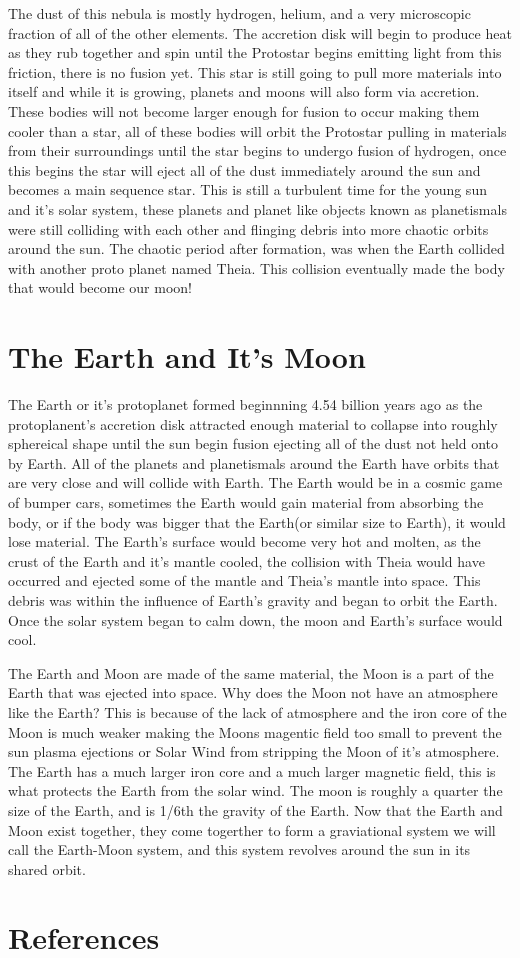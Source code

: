 \documentclass[12pt,oneside,a4paper,english]{article}
\begin{document}
The dust of this nebula is mostly hydrogen, helium, and a very microscopic fraction of all of the other elements. The accretion disk will begin to produce heat as they rub together and spin until the Protostar begins emitting light from this friction, there is no fusion yet. This star is still going to pull more materials into itself and while it is growing, planets and moons will also form via accretion. These bodies will not become larger enough for fusion to occur making them cooler than a star, all of these bodies will orbit the Protostar pulling in materials from their surroundings until the star begins to undergo fusion of hydrogen, once this begins the star will eject all of the dust immediately around the sun and becomes a main sequence star. This is still a turbulent time for the young sun and it's solar system, these planets and planet like objects known as planetismals were still colliding with each other and flinging debris into more chaotic orbits around the sun. The chaotic period after formation, was when the Earth collided with another proto planet named Theia\cite{moonformation}. This collision eventually made the body that would become our moon!
\section{The Earth and It's Moon}
The Earth or it's protoplanet formed beginnning 4.54 billion years ago as the protoplanent's accretion disk attracted enough material to collapse into roughly sphereical shape until the sun begin fusion ejecting all of the dust not held onto by Earth. All of the planets and planetismals around the Earth have orbits that are very close and will collide with Earth. The Earth would be in a cosmic game of bumper cars, sometimes the Earth would gain material from absorbing the body, or if the body was bigger that the Earth(or similar size to Earth), it would lose material. The Earth's surface would become very hot and molten, as the crust of the Earth and it's mantle cooled, the collision with Theia would have occurred and ejected some of the mantle and Theia's mantle into space. This debris was within the influence of Earth's gravity and began to orbit the Earth. Once the solar system began to calm down, the moon and Earth's surface would cool. 

The Earth and Moon are made of the same material, the Moon is a part of the Earth that was ejected into space. Why does the Moon not have an atmosphere like the Earth? This is because of the lack of atmosphere and the iron core of the Moon is much weaker making the Moons magentic field too small to prevent the sun plasma ejections or Solar Wind from stripping the Moon of it's atmosphere. The Earth has a much larger iron core and a much larger magnetic field, this is what protects the Earth from the solar wind. The moon is roughly a quarter the size of the Earth, and is 1/6th the gravity of the Earth. Now that the Earth and Moon exist together, they come togerther to form a graviational system we will call the Earth-Moon system, and this system revolves around the sun in its shared orbit. 

\section{References}


\end{document}
